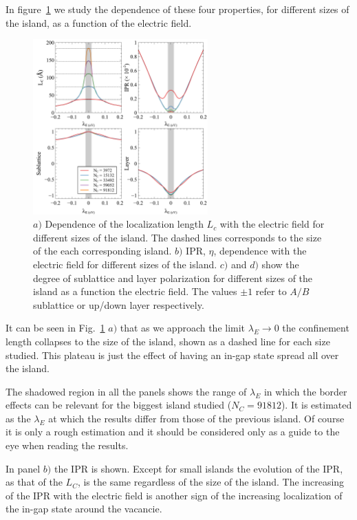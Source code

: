 In figure~\ref{IPR_lc} we study the dependence of these four properties, for different sizes of the island, as a function of the electric field.
\begin{figure}[!ht]
\centering
\includegraphics[width=0.6\textwidth]{chapter06/figures/single_vac_properties.pdf}
\vspace{-5pt}
\caption{$a)$ Dependence of the localization length $L_c$ with the electric field for different sizes of the island. The dashed lines corresponds to the size of the each corresponding island. $b)$ IPR, $\eta$, dependence with the electric field for different sizes of the island. $c)$ and $d)$ show the degree of sublattice and layer polarization for different sizes of the island as a function the electric field. The values $\pm1$ refer to $A/B$ sublattice or up/down layer respectively.}
\label{IPR_lc}
\end{figure}
\FloatBarrier

It can be seen in Fig.~\ref{IPR_lc} $a)$ that as we approach the limit $\lambda_E\rightarrow0$ the confinement length collapses to the size of the island, shown as a dashed line for each size studied. This plateau is just the effect of having an in-gap state spread all over the island.

The shadowed region in all the panels shows the range of $\lambda_E$ in which the border effects can be relevant for the biggest island studied ($N_C=91812$). It is estimated as the $\lambda_E$ at which the results differ from those of the previous island. Of course it is only a rough estimation and it should be considered only as a guide to the eye when reading the results.

In panel $b)$ the IPR is shown. Except for small islands the evolution of the IPR, as that of the $L_C$, is the same regardless of the size of the island. The increasing of the IPR with the electric field is another sign of the increasing localization of the in-gap state around the vacancie.\\

